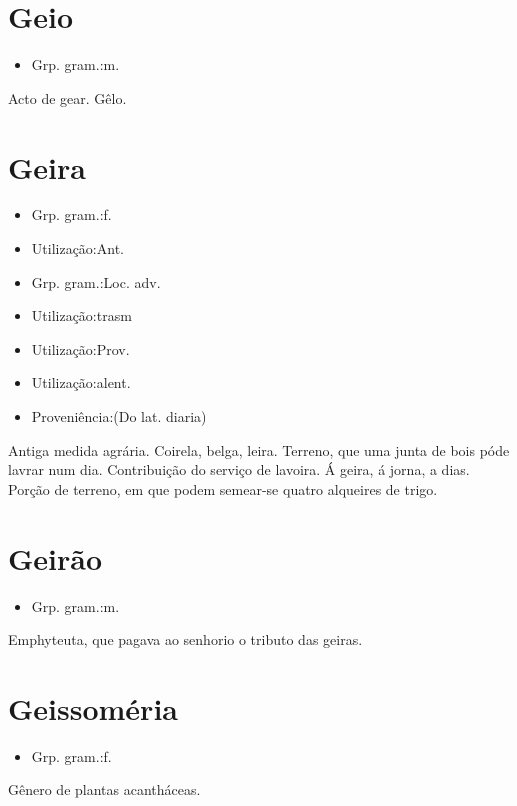 \section{Geio}
\begin{itemize}
\item {Grp. gram.:m.}
\end{itemize}
Acto de gear.
Gêlo.
\section{Geira}
\begin{itemize}
\item {Grp. gram.:f.}
\end{itemize}
\begin{itemize}
\item {Utilização:Ant.}
\end{itemize}
\begin{itemize}
\item {Grp. gram.:Loc. adv.}
\end{itemize}
\begin{itemize}
\item {Utilização:trasm}
\end{itemize}
\begin{itemize}
\item {Utilização:Prov.}
\end{itemize}
\begin{itemize}
\item {Utilização:alent.}
\end{itemize}
\begin{itemize}
\item {Proveniência:(Do lat. \textunderscore diaria\textunderscore )}
\end{itemize}
Antiga medida agrária.
Coirela, belga, leira.
Terreno, que uma junta de bois póde lavrar num dia.
Contribuição do serviço de lavoira.
\textunderscore Á geira\textunderscore , á jorna, a dias.
Porção de terreno, em que podem semear-se quatro alqueires de trigo.
\section{Geirão}
\begin{itemize}
\item {Grp. gram.:m.}
\end{itemize}
Emphyteuta, que pagava ao senhorio o tributo das geiras.
\section{Geissoméria}
\begin{itemize}
\item {Grp. gram.:f.}
\end{itemize}
Gênero de plantas acantháceas.
